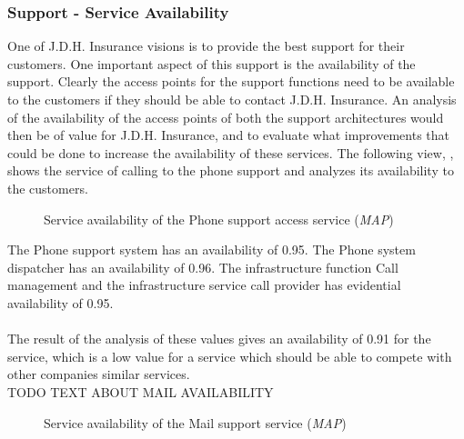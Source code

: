\subsubsection{Support - Service Availability}
\label{sec:support_analysis}
One of J.D.H. Insurance visions is to provide the best support for their customers. One important aspect of this support is the availability of the support. Clearly the access points for the support functions need to be available to the customers if they should be able to contact J.D.H. Insurance. An analysis of the availability of the access points of both the support architectures would then be of value for J.D.H. Insurance, and to evaluate what improvements that could be done to increase the availability of these services. The following view, , shows the service of calling to the phone support and analyzes its availability to the customers.
\begin{center}
	\begin{figure}[H]
		\centering
		\setlength\fboxsep{7pt}
		\setlength\fboxrule{0.5pt}
		\caption{Service availability of the Phone support access service (\emph{MAP})}
		\label{fig:map_support_phone_availability}
	\end{figure}
\end{center}
The Phone support system has an availability of 0.95. The Phone system dispatcher has an availability of 0.96. The infrastructure function Call management and the infrastructure service call provider has evidential availability of 0.95.\\\\
%
The result of the analysis of these values gives an availability of 0.91 for the service, which is a low value for a service which should be able to compete with other companies similar services.
\\TODO TEXT ABOUT MAIL AVAILABILITY\\
\begin{center}
	\begin{figure}[H]
		\centering
		\setlength\fboxsep{7pt}
		\setlength\fboxrule{0.5pt}
		\caption{Service availability of the Mail support service (\emph{MAP})}
		\label{fig:map_support_mail_availability}
	\end{figure}
\end{center}


%

